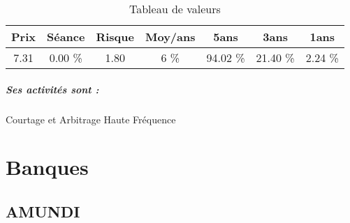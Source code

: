 \documentclass[11pt,a4paper]{report}%
\begin{document}
\begin{table}[H]
  \centering
    \begin{tabular}{|c|c|c|c|c|c|c|}
    \hline
    Prix & Séance & Risque  & Moy/ans & 5ans & 3ans & 1ans \\
    \hline
    7.31 &    0.00 \%    & 1.80 & 6 \% & 94.02 \% & 21.40 \% & 2.24 \% \\
    \hline
    \end{tabular}%
        \label{tab:table_ABC ARBITRAGE}%
      \caption{Tableau de valeurs}
\end{table}%

\paragraph{Ses activités sont : } Courtage et Arbitrage Haute Fréquence 
    
    \newpage\chapter{Banques}


\section{AMUNDI}
\end{document}
